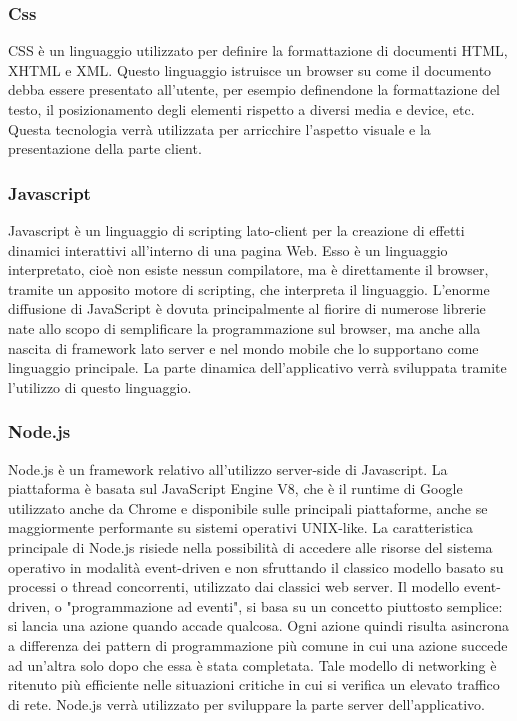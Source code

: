 \subsubsection{Css}
CSS è un linguaggio utilizzato per definire la formattazione di documenti HTML, XHTML e XML.
Questo linguaggio istruisce un browser su come il documento debba essere presentato all'utente, per esempio definendone la formattazione del testo, il posizionamento degli elementi rispetto a diversi media e device, etc.
Questa tecnologia verrà utilizzata per arricchire l'aspetto visuale e la presentazione della parte client.
\subsubsection{Javascript}
Javascript è un linguaggio di scripting lato-client per la creazione di effetti dinamici interattivi all'interno di una pagina Web. Esso è un linguaggio interpretato, cioè non esiste nessun compilatore, ma è direttamente il browser, tramite un apposito motore di scripting, che interpreta il linguaggio.
L’enorme diffusione di JavaScript è dovuta principalmente al fiorire di numerose librerie nate allo scopo di semplificare la programmazione sul browser, ma anche alla nascita di framework lato server e nel mondo mobile che lo supportano come linguaggio principale.
La parte dinamica dell'applicativo verrà sviluppata tramite l'utilizzo di questo linguaggio.

\subsubsection{Node.js}
Node.js è un framework relativo all'utilizzo server-side di Javascript.
La piattaforma è basata sul JavaScript Engine V8, che è il runtime di Google utilizzato anche da Chrome e disponibile sulle principali piattaforme, anche se maggiormente performante su sistemi operativi UNIX-like.
La caratteristica principale di Node.js risiede nella possibilità di accedere alle risorse del sistema operativo in modalità event-driven e non sfruttando il classico modello basato su processi o thread concorrenti, utilizzato dai classici web server.
Il modello event-driven, o "programmazione ad eventi", si basa su un concetto piuttosto semplice: si lancia una azione quando accade qualcosa. Ogni azione quindi risulta asincrona a differenza dei pattern di programmazione più comune in cui una azione succede ad un'altra solo dopo che essa è stata completata.
Tale modello di networking è ritenuto più efficiente nelle situazioni critiche in cui si verifica un elevato traffico di rete.
Node.js verrà utilizzato per sviluppare la parte server dell'applicativo.



